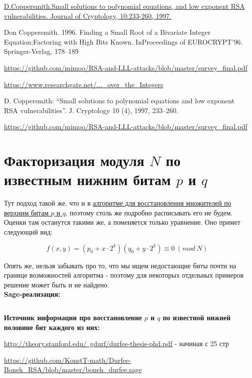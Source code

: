 \documentclass[12pt,a4paper]{scrartcl}
\begin{document}
\href{https://www.di.ens.fr/~fouque/ens-rennes/coppersmith.pdf}{D.Coppersmith.Small solutions to polynomial equations, and low exponent RSA vulnerabilities. Journal of Cryptology, 10:233-260, 1997.}

Don Coppersmith. 1996. Finding a Small Root of a Bivariate Integer Equation;Factoring with High Bits Known. InProceedings of EUROCRYPT’96. Springer-Verlag, 178–189

\href{https://github.com/mimoo/RSA-and-LLL-attacks/blob/master/survey_final.pdf}{https://github.com/mimoo/RSA-and-LLL-attacks/blob/master/survey\_final.pdf}

\href{https://www.researchgate.net/publication/220334831_An_Algorithm_for_Finding_Small_Roots_of_Multivariate_Polynomials_over_the_Integers}{https://www.researchgate.net/...\_over\_the\_Integers}

D. Coppersmith: “Small solutions to polynomial equations and low exponent RSA vulnerabilities”. J. Cryptology 10 (4), 1997, 233–260.

\href{https://github.com/mimoo/RSA-and-LLL-attacks/blob/master/survey_final.pdf}{https://github.com/mimoo/RSA-and-LLL-attacks/blob/master/survey\_final.pdf}

\section{Факторизация модуля $N$ по известным нижним битам $p$ и $q$}

Тут подход такой же, что и в \href{https://yatb.kksctf.ru/}{алгоритме для восстановления множителей по верхним битам $p$ и $q$}, поэтому столь же подробно расписывать его не будем. Оценки там останутся такими же, а поменяется только уравнение. Оно примет следующий вид:

$$f(x,y)=(p_0+x\cdot2^k)(q_0+y\cdot2^k)\equiv 0\ (mod\ N)$$

Опять же, нельзя забывать про то, что мы ищем недостающие биты почти на границе возможностей алгоритма - поэтому для некоторых отдельных примеров решение может быть и не найдено.\\

\textbf{Sage-реализация:}

\inputminted[tabsize=4,obeytabs,fontsize=\footnotesize]{python3}{./RSA_scripts/lower_bit_p_and_q.sage}

\textbf{Источник информации про восстановление  $p$ и $q$ по известной нижней половине бит каждого из них:}

\href{http://theory.stanford.edu/~gdurf/durfee-thesis-phd.pdf}{http://theory.stanford.edu/~gdurf/durfee-thesis-phd.pdf} - начиная с 25 стр

\href{https://github.com/KonstT-math/Durfee-Boneh_RSA/blob/master/boneh_durfee.sage}{https://github.com/KonstT-math/Durfee-Boneh\_RSA/blob/master/boneh\_durfee.sage}
\end{document}
